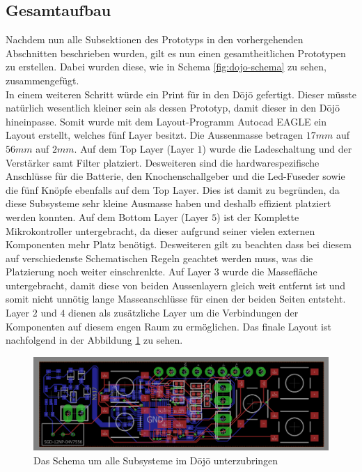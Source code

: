 \subsection{Gesamtaufbau} \label{sec:gesamtaufbau}
Nachdem nun alle Subsektionen des Prototyps in den vorhergehenden Abschnitten beschrieben wurden, gilt es nun einen gesamtheitlichen Prototypen zu erstellen. Dabei wurden diese, wie in Schema \ref{fig:dojo-schema} zu sehen, zusammengefügt.\\
In einem weiteren Schritt würde ein Print für in den Dōjō gefertigt. Dieser müsste natürlich wesentlich kleiner sein als dessen Prototyp, damit dieser in den Dōjō hineinpasse. Somit wurde mit dem Layout-Programm Autocad EAGLE ein Layout erstellt, welches fünf Layer besitzt. Die Aussenmasse betragen $17mm$ auf $56mm$ auf $2mm$. Auf dem Top Layer (Layer $1$) wurde die Ladeschaltung und der Verstärker samt Filter platziert. Desweiteren sind die  hardwarespezifische Anschlüsse für die Batterie, den Knochenschallgeber und die Led-Fuseder sowie die fünf Knöpfe ebenfalls auf dem Top Layer. Dies ist damit zu begründen, da diese Subsysteme sehr kleine Ausmasse haben und deshalb effizient platziert werden konnten. Auf dem Bottom Layer (Layer $5$) ist der Komplette Mikrokontroller untergebracht, da dieser aufgrund seiner vielen externen Komponenten mehr Platz benötigt. Desweiteren gilt zu beachten dass bei diesem auf verschiedenste Schematischen Regeln geachtet werden muss, was die Platzierung noch weiter einschrenkte. Auf Layer $3$ wurde die Massefläche untergebracht, damit diese von beiden Aussenlayern gleich weit entfernt ist und somit nicht unnötig lange Masseanschlüsse für einen der beiden Seiten entsteht. Layer $2$ und $4$ dienen als zusätzliche Layer um die Verbindungen der Komponenten auf diesem engen Raum zu ermöglichen. Das finale Layout ist nachfolgend in der Abbildung \ref{fig:Dojo_layout} zu sehen.
\begin{figure}[H]
	\begin{center}
		\includegraphics[width=160mm]{data/dojo_layout.png}
		\caption[Das Schema um alle Subsysteme im Dōjō unterzubringen]{Das Schema um alle Subsysteme im Dōjō unterzubringen} %
		\label{fig:Dojo_layout}
	\end{center}
\end{figure}

